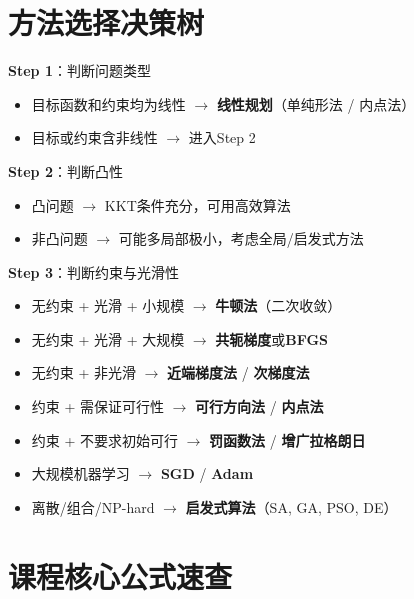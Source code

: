 \section{方法选择决策树}

\begin{algobox}[方法选择指南]
\textbf{Step 1}：判断问题类型
\begin{itemize}
    \item 目标函数和约束均为线性 $\rightarrow$ \textbf{线性规划}（单纯形法 / 内点法）
    \item 目标或约束含非线性 $\rightarrow$ 进入Step 2
\end{itemize}

\textbf{Step 2}：判断凸性
\begin{itemize}
    \item 凸问题 $\rightarrow$ KKT条件充分，可用高效算法
    \item 非凸问题 $\rightarrow$ 可能多局部极小，考虑全局/启发式方法
\end{itemize}

\textbf{Step 3}：判断约束与光滑性
\begin{itemize}
    \item 无约束 + 光滑 + 小规模 $\rightarrow$ \textbf{牛顿法}（二次收敛）
    \item 无约束 + 光滑 + 大规模 $\rightarrow$ \textbf{共轭梯度}或\textbf{BFGS}
    \item 无约束 + 非光滑 $\rightarrow$ \textbf{近端梯度法} / \textbf{次梯度法}
    \item 约束 + 需保证可行性 $\rightarrow$ \textbf{可行方向法} / \textbf{内点法}
    \item 约束 + 不要求初始可行 $\rightarrow$ \textbf{罚函数法} / \textbf{增广拉格朗日}
    \item 大规模机器学习 $\rightarrow$ \textbf{SGD} / \textbf{Adam}
    \item 离散/组合/NP-hard $\rightarrow$ \textbf{启发式算法}（SA, GA, PSO, DE）
\end{itemize}
\end{algobox}

\section{课程核心公式速查}

